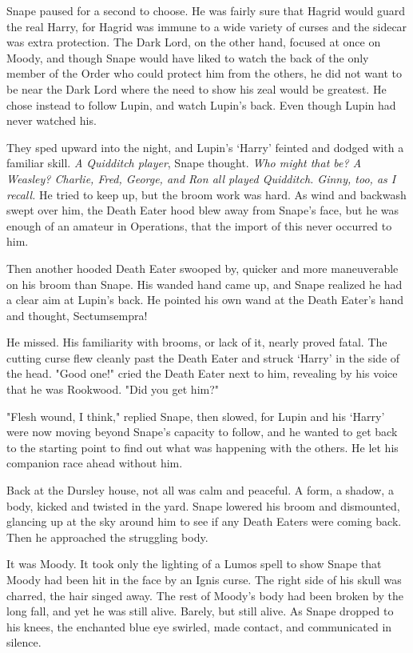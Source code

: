 Snape paused for a second to choose. He was fairly sure that Hagrid would guard the real Harry, for Hagrid was immune to a wide variety of curses and the sidecar was extra protection. The Dark Lord, on the other hand, focused at once on Moody, and though Snape would have liked to watch the back of the only member of the Order who could protect him from the others, he did not want to be near the Dark Lord where the need to show his zeal would be greatest. He chose instead to follow Lupin, and watch Lupin's back. Even though Lupin had never watched his.

They sped upward into the night, and Lupin's `Harry' feinted and dodged with a familiar skill. \emph{A Quidditch player}, Snape thought. \emph{Who might that be? A Weasley? Charlie, Fred, George, and Ron all played Quidditch. Ginny, too, as I recall.} He tried to keep up, but the broom work was hard. As wind and backwash swept over him, the Death Eater hood blew away from Snape's face, but he was enough of an amateur in Operations, that the import of this never occurred to him.

Then another hooded Death Eater swooped by, quicker and more maneuverable on his broom than Snape. His wanded hand came up, and Snape realized he had a clear aim at Lupin's back. He pointed his own wand at the Death Eater's hand and thought, Sectumsempra!

He missed. His familiarity with brooms, or lack of it, nearly proved fatal. The cutting curse flew cleanly past the Death Eater and struck `Harry' in the side of the head. "Good one!" cried the Death Eater next to him, revealing by his voice that he was Rookwood. "Did you get him?"

"Flesh wound, I think," replied Snape, then slowed, for Lupin and his `Harry' were now moving beyond Snape's capacity to follow, and he wanted to get back to the starting point to find out what was happening with the others. He let his companion race ahead without him.

Back at the Dursley house, not all was calm and peaceful. A form, a shadow, a body, kicked and twisted in the yard. Snape lowered his broom and dismounted, glancing up at the sky around him to see if any Death Eaters were coming back. Then he approached the struggling body.

It was Moody. It took only the lighting of a Lumos spell to show Snape that Moody had been hit in the face by an Ignis curse. The right side of his skull was charred, the hair singed away. The rest of Moody's body had been broken by the long fall, and yet he was still alive. Barely, but still alive. As Snape dropped to his knees, the enchanted blue eye swirled, made contact, and communicated in silence.


